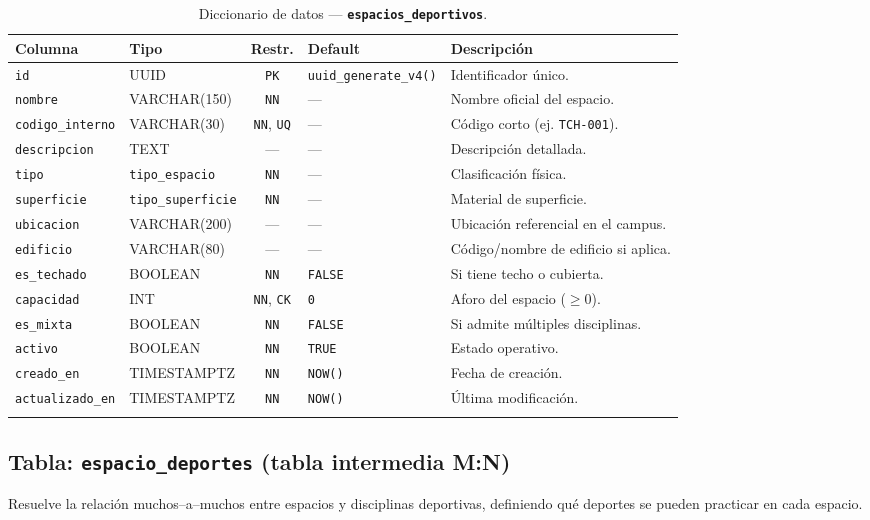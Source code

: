 \documentclass[12pt, a4paper]{article}
\newcommand{\pk}{\texttt{PK}}
\newcommand{\uq}{\texttt{UQ}}
\newcommand{\nn}{\texttt{NN}}
\newcommand{\chk}{\texttt{CK}}
\newcommand{\tname}[1]{\texttt{\textbf{#1}}}
\newcommand{\cname}[1]{\texttt{#1}}
\begin{document}
\begin{longtable}{l l c l p{4.5cm}}
    \toprule
    \textbf{Columna} & \textbf{Tipo} & \textbf{Restr.} & \textbf{Default} & \textbf{Descripción} \\
    \midrule
    \endhead
    \cname{id} & UUID & \pk & \texttt{uuid\_generate\_v4()} & Identificador único. \\
    \cname{nombre} & VARCHAR(150) & \nn & --- & Nombre oficial del espacio. \\
    \cname{codigo\_interno} & VARCHAR(30) & \nn, \uq & --- & Código corto (ej. \texttt{TCH-001}). \\
    \cname{descripcion} & TEXT & --- & --- & Descripción detallada. \\
    \cname{tipo} & \texttt{tipo\_espacio} & \nn & --- & Clasificación física. \\
    \cname{superficie} & \texttt{tipo\_superficie} & \nn & --- & Material de superficie. \\
    \cname{ubicacion} & VARCHAR(200) & --- & --- & Ubicación referencial en el campus. \\
    \cname{edificio} & VARCHAR(80) & --- & --- & Código/nombre de edificio si aplica. \\
    \cname{es\_techado} & BOOLEAN & \nn & \texttt{FALSE} & Si tiene techo o cubierta. \\
    \cname{capacidad} & INT & \nn, \chk & \texttt{0} & Aforo del espacio ($\geq 0$). \\
    \cname{es\_mixta} & BOOLEAN & \nn & \texttt{FALSE} & Si admite múltiples disciplinas. \\
    \cname{activo} & BOOLEAN & \nn & \texttt{TRUE} & Estado operativo. \\
    \cname{creado\_en} & TIMESTAMPTZ & \nn & \texttt{NOW()} & Fecha de creación. \\
    \cname{actualizado\_en} & TIMESTAMPTZ & \nn & \texttt{NOW()} & Última modificación. \\
    \bottomrule
    \caption{Diccionario de datos --- \tname{espacios\_deportivos}.}
\end{longtable}

\subsection{Tabla: \tname{espacio\_deportes} (tabla intermedia M:N)}

Resuelve la relación muchos--a--muchos entre espacios y disciplinas deportivas, definiendo qué deportes se pueden practicar en cada espacio.
\end{document}
